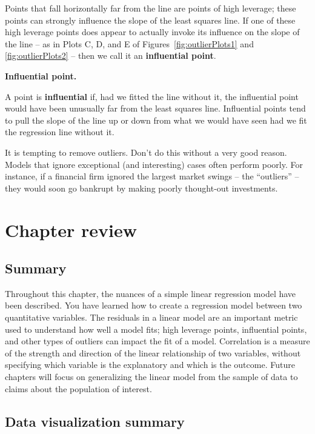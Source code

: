 \documentclass[
  10pt,
  openany]{book}
\theoremstyle{definition}
\theoremstyle{definition}
\theoremstyle{definition}
\theoremstyle{definition}
\theoremstyle{remark}
\begin{document}
Points that fall horizontally far from the line are points of high leverage; these points can strongly influence the slope of the least squares line.
If one of these high leverage points does appear to actually invoke its influence on the slope of the line -- as in Plots C, D, and E of Figures~\ref{fig:outlierPlots1} and \ref{fig:outlierPlots2} -- then we call it an \textbf{influential point}.

\textbf{Influential point.}

A point is \textbf{influential} if, had we fitted the line without it, the influential point would have been unusually far from the least squares line.
Influential points tend to pull the slope of the line up or down from what we would have seen had we fit the regression line without it.

It is tempting to remove outliers. Don't do this without a very good reason.
Models that ignore exceptional (and interesting) cases often perform poorly.
For instance, if a financial firm ignored the largest market swings -- the ``outliers'' -- they would soon go bankrupt by making poorly thought-out investments.

\section{Chapter review}\label{chp6-review}

\subsection*{Summary}\label{summary-4}

Throughout this chapter, the nuances of a simple linear regression model have been described.
You have learned how to create a regression model between two quantitative variables.
The residuals in a linear model are an important metric used to understand how well a model fits; high leverage points, influential points, and other types of outliers can impact the fit of a model.
Correlation is a measure of the strength and direction of the linear relationship of two variables, without specifying which variable is the explanatory and which is the outcome.
Future chapters will focus on generalizing the linear model from the sample of data to claims about the population of interest.

\subsection*{Data visualization summary}\label{data-visualization-summary}
\end{document}
